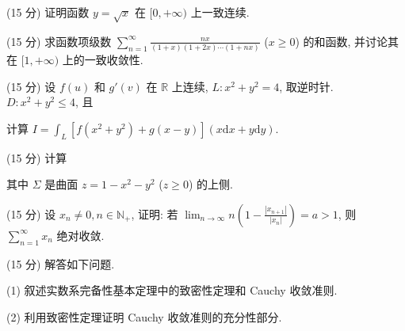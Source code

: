 \par{}
(15 分) 证明函数 $y = \sqrt{x}$ 在 $[0, +\infty)$ 上一致连续.\par
\par{}
(15 分) 求函数项级数 $\sum_{n=1}^{\infty} \frac{nx}{(1+x)(1+2x)\cdots(1+nx)}$ ($x \geq 0$) 的和函数, 并讨论其在 $[1, +\infty)$ 上的一致收敛性.\par
\par{}
\par{}
(15 分) 设 $f(u)$ 和 $g'(v)$ 在 $\mathbb{R}$ 上连续, $L: x^2 + y^2 = 4$, 取逆时针. $D: x^2 + y^2 \leq 4$, 且\par
\nopagebreak[4]
计算 $I = \int_{L}[f(x^{2} + y^{2}) + g(x - y)](x\mathrm{d}x + y\mathrm{d}y).$\par
\par{}
\par{}
(15 分) 计算\par
\nopagebreak[4]
其中 $\Sigma$ 是曲面 $z = 1 - x^{2} - y^{2}$ ($z \geq 0$) 的上侧.\par
\par{}
(15 分) 设 $x_{n} \neq 0, n \in \mathbb{N}_{+}$, 证明: 若 $\lim_{n \to \infty} n\left(1 - \frac{|x_{n+1}|}{|x_{n}|}\right) = a > 1$, 则 $\sum_{n=1}^{\infty} x_{n}$ 绝对收敛.\par
\par{}
(15 分) 解答如下问题.\par
(1) 叙述实数系完备性基本定理中的致密性定理和 Cauchy 收敛准则.\par
(2) 利用致密性定理证明 Cauchy 收敛准则的充分性部分.\par
